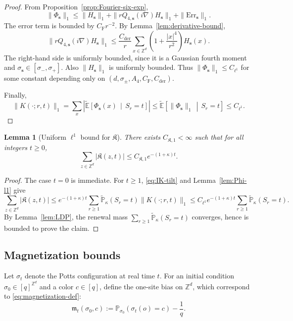 \documentclass[letterpaper,11pt,reqno]{amsart}
\newtheorem{lemma}[thm]{Lemma}
\theoremstyle{definition}
\newcommand{\IK}{\mathfrak{K}}
\newcommand{\vs}{\mathbf{s}}\newcommand{\vt}{\mathbf{t}}\newcommand{\vu}{\mathbf{u}}
\begin{document}
\begin{proof}
From Proposition~\ref{prop:Fourier-six-exp},
\[
\|\Phi_{\mathbf s}\|_1
\le
\|H_{\mathbf s}\|_1+\|rQ_{4,\mathbf s}(i\nabla)H_{\mathbf s}\|_1+\|\mathrm{Err}_{\mathbf s}\|_1.
\]
The error term is bounded by \(C_{\mathrm F}r^{-2}\). By Lemma~\ref{lem:derivative-bound},
\[
\|rQ_{4,\mathbf s}(i\nabla)H_{\mathbf s}\|_1
\le
\frac{C_{\mathrm{der}}}{r}
\sum_{x\in\mathbb Z^d}\left(1+\frac{|x|^4}{r^2}\right)H_{\mathbf s}(x).
\]
The right-hand side is uniformly bounded, since it is a Gaussian fourth moment and
\(\sigma_{\mathbf s}\in[\sigma_-,\sigma_+]\).
Also $\|H_{\vs}\|_1$ is uniformly bounded.
Thus $\|\Phi_{\vs}\|_1\le C_{\ell^1}$ for some constant depending only on $(d,\sigma_\pm,A_4,C_{\mathrm F},C_{\mathrm{der}})$.

Finally,
\[
\|K(\cdot;r,t)\|_1
=
\sum_x\left|\tilde{\mathbb E}\!\left[\Phi_{\mathbf s}(x)\,\middle|\,S_r=t\right]\right|
\le
\tilde{\mathbb E}\!\left[\|\Phi_{\mathbf s}\|_1\,\middle|\,S_r=t\right]
\le
C_{\ell^1}.
\]
\end{proof}

\begin{lemma}[Uniform \(\ell^1\) bound for \(\IK\)]\label{lem:IK-l1}
There exists \(C_{\IK,1}<\infty\) such that for all integers \(t\ge0\),
\begin{equation*}
\sum_{z\in\mathbb Z^d}|\IK(z,t)|\le C_{\IK,1}e^{-(1+\kappa)t}.
\end{equation*}
\end{lemma}

\begin{proof}
The case \(t=0\) is immediate. For \(t\ge1\), \eqref{eq:IK-tilt} and Lemma~\ref{lem:Phi-l1} give
\[
\sum_{z\in\mathbb Z^d}|\IK(z,t)|
\le
e^{-(1+\kappa)t}\sum_{r\ge1}\tilde{\mathbb P}_\kappa(S_r=t)\|K(\cdot;r,t)\|_1
\le
C_{\ell^1}e^{-(1+\kappa)t}\sum_{r\ge1}\tilde{\mathbb P}_\kappa(S_r=t).
\]
By Lemma~\ref{lem:LDP}, the renewal mass \(\sum_{r\ge1}\tilde{\mathbb P}_\kappa(S_r=t)\) converges, hence is bounded to prove the claim.
\end{proof}





\smallskip


\subsection{Magnetization bounds}
\label{subsec:mag-analysis}

Let \(\sigma_t\) denote the Potts configuration at real time \(t\). For an initial condition
\(\sigma_0\in[q]^{\mathbb Z^d}\) and a color \(c\in[q]\), define the one-site bias on $\mathbb{Z}^d$, which correspond to \eqref{eq:magnetization-def}:
\[
    \mathfrak m_t(\sigma_0,c)
    :=
    \mathbb P_{\sigma_0}(\sigma_t(o)=c)-\frac1q.
\]
\end{document}
